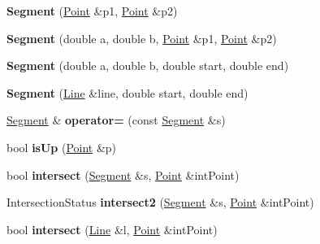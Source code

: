 \begin{DoxyCompactItemize}
\item 
\hypertarget{classSegment_ad0e5c8d754ce5a75481cfc7f219c0e89}{{\bfseries Segment} (\hyperlink{structPoint}{Point} \&p1, \hyperlink{structPoint}{Point} \&p2)}\label{classSegment_ad0e5c8d754ce5a75481cfc7f219c0e89}

\item 
\hypertarget{classSegment_aaccb675d9d27369adc8c43cba7b4ca30}{{\bfseries Segment} (double a, double b, \hyperlink{structPoint}{Point} \&p1, \hyperlink{structPoint}{Point} \&p2)}\label{classSegment_aaccb675d9d27369adc8c43cba7b4ca30}

\item 
\hypertarget{classSegment_a3bd6adc6bdf33075f6bdfa0531af2ef0}{{\bfseries Segment} (double a, double b, double start, double end)}\label{classSegment_a3bd6adc6bdf33075f6bdfa0531af2ef0}

\item 
\hypertarget{classSegment_a615337a1fad34f28e0c2b23e40c18521}{{\bfseries Segment} (\hyperlink{classLine}{Line} \&line, double start, double end)}\label{classSegment_a615337a1fad34f28e0c2b23e40c18521}

\item 
\hypertarget{classSegment_a657326272bf487b464c1ccada4f610a7}{\hyperlink{classSegment}{Segment} \& {\bfseries operator=} (const \hyperlink{classSegment}{Segment} \&s)}\label{classSegment_a657326272bf487b464c1ccada4f610a7}

\item 
\hypertarget{classSegment_a105101551a17e1eeaea3a60382c32d99}{bool {\bfseries is\-Up} (\hyperlink{structPoint}{Point} \&p)}\label{classSegment_a105101551a17e1eeaea3a60382c32d99}

\item 
\hypertarget{classSegment_a1da058c85124d8155e5542ece5ed7265}{bool {\bfseries intersect} (\hyperlink{classSegment}{Segment} \&s, \hyperlink{structPoint}{Point} \&int\-Point)}\label{classSegment_a1da058c85124d8155e5542ece5ed7265}

\item 
\hypertarget{classSegment_a1cadab8806d3846eb594fabfcbe48ebe}{Intersection\-Status {\bfseries intersect2} (\hyperlink{classSegment}{Segment} \&s, \hyperlink{structPoint}{Point} \&int\-Point)}\label{classSegment_a1cadab8806d3846eb594fabfcbe48ebe}

\item 
\hypertarget{classSegment_a1d6a246b4cc993eccabd8841b3e5b411}{bool {\bfseries intersect} (\hyperlink{classLine}{Line} \&l, \hyperlink{structPoint}{Point} \&int\-Point)}\label{classSegment_a1d6a246b4cc993eccabd8841b3e5b411}


\end{DoxyCompactItemize}
